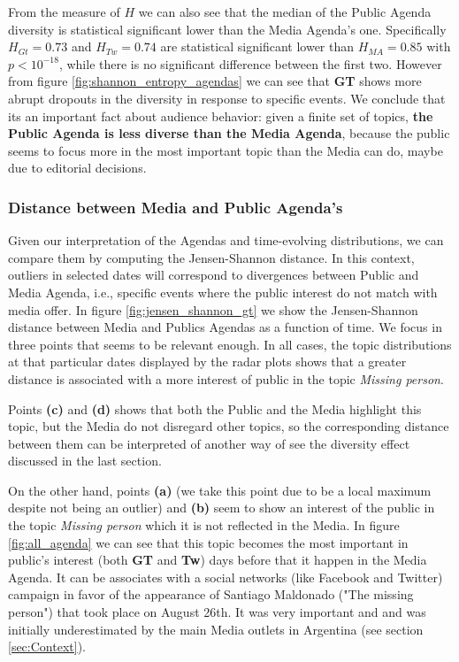 \documentclass[a4paper, 12pt]{article}
\begin{document}
\par From the measure of $H$ we can also see that the median of the Public Agenda diversity is statistical significant lower than the Media Agenda's one.
Specifically $H_{Gt} = 0.73$ and $H_{Tw} = 0.74$ are statistical significant lower than $H_{MA} = 0.85$ with $p < 10^{-18}$, while there is no significant difference between the first two. 
However from figure \ref{fig:shannon_entropy_agendas} we can see that \textbf{GT} shows more abrupt dropouts in the diversity in response to specific events.
We conclude that its an important fact about audience behavior: given a finite set of topics, \textbf{the Public Agenda is less diverse than the Media Agenda}, because the public seems to focus more in the most important topic than the Media can do, maybe due to editorial decisions.

\subsubsection{Distance between Media and Public Agenda's }


\par Given our interpretation of  the Agendas and time-evolving distributions, we can  compare them by computing the Jensen-Shannon distance. In this context, outliers in selected dates will correspond to divergences between Public and Media Agenda, i.e., specific events where the public interest do not match with media offer.
In figure \ref{fig:jensen_shannon_gt} we show the Jensen-Shannon distance between Media and Publics Agendas as a function of time. We focus in three points that seems to be relevant enough. In all cases, the topic distributions at that particular dates displayed by  the radar plots shows that a greater distance is associated with a more interest of public in the topic \emph{Missing person}. 
\par Points \textbf{(c)} and \textbf{(d)} shows that both the Public and the Media highlight this topic, but the Media do not disregard other topics, so the corresponding distance between them can be interpreted  of another way of see  the diversity effect discussed in the last section.

\par On the other hand,  points \textbf{(a)} (we take this point due to be a local maximum despite not being an outlier) and \textbf{(b)} seem to show an interest of the public in the topic \emph{Missing person} which it is not reflected in the Media.  In figure \ref{fig:all_agenda} we can see that this topic becomes the most important in public's interest (both \textbf{GT} and \textbf{Tw}) days before that  it happen in the Media Agenda. It can be associates  with a social networks (like Facebook and Twitter) campaign  in favor  of the appearance of Santiago Maldonado ("The missing person") that took place on  August 26th. It was very important and and was initially underestimated by the main Media outlets in Argentina (see section \ref{sec:Context}). 
\end{document}
